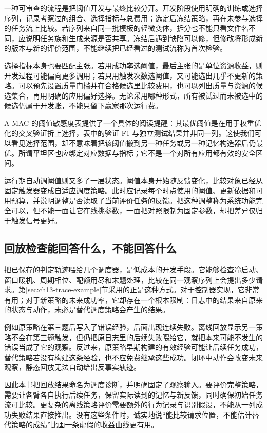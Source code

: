 一种可审查的流程是把阈值开发与最终比较分开。开发阶段使用明确的训练或选择序列，记录考察过的组合、选择指标与总费用；选定后冻结策略，再在未参与选择的任务流上比较。若序列来自同一批模板的轻微变体，拆分也不能只看文件名不同，应说明任务族和生成来源是否共享。冻结后遇到缺陷可以修，但修改将形成新的版本与新的评价范围，不能继续把已经看过的测试流称为首次检验。

选择指标本身也要匹配主张。若用成功率选阈值，最后主张的是单位资源收益，则开发过程可能偏向更多调用；若只用触发次数选阈值，又可能选出几乎不更新的策略。可以预先设置质量门槛并在合格候选里比较费用，也可以列出质量与资源的候选集合，再用明确的应用偏好选择。无论采用哪种形式，所有被试过而未被选中的候选仍属于开发账，不能只留下赢家那次运行费。

A-MAC 的阈值敏感度表提供了一个具体的阅读提醒：其最优阈值是在用于权重优化的交叉验证折上选择，表中的验证 F1 与独立测试结果并非同一列\cite{amac-2603}。这使我们可以看见选择范围，却不意味着把该阈值搬到另一种任务或另一种记忆构造器后仍最优。所谓平坦区也应绑定对应数据与指标；它不是一个对所有应用都有效的安全区间。

运行期自动调阈值则又多了一层状态。阈值本身开始随反馈变化，比较对象已经从固定触发器变成自适应调度策略。此时应记录每个时点使用的阈值、更新依据和可用预算，并说明调整是否读取了当前评价任务的反馈。把这种调整称为系统功能完全可以，但不能一面让它在线挑参数，一面把对照限制为固定参数，却把差异仅归于触发信号更好。

\subsection{回放检查能回答什么，不能回答什么}

把已保存的判定轨迹喂给几个调度器，是低成本的开发手段。它能够检查冷启动、窗口暖机、周期相位、配额用尽和末题处理，比较在同一观察序列上会提出多少请求。第\ref{sec:ch13-trace-example}节采用的正是这种方式。对于控制器实现，它非常有用；对于新策略的未来成功率，它却存在一个根本限制：日志中的结果来自原来的状态与动作，未必是替代调度策略会产生的结果。

例如原策略在第三题后写入了错误经验，后面出现连续失败。离线回放显示另一策略不会在第三题触发，但仍把原日志里的后续失败喂给它，就把本来可能不发生的错误当成了它的观察。反过来，原策略早期构建的有效经验可能让后续任务成功，替代策略若没有构建这条经验，也不应免费继承这些成功。闭环中动作会改变未来观察，静态回放无法自动给出反事实轨迹。

因此本书把回放结果命名为调度诊断，并明确固定了观察输入。要评价完整策略，需要让各臂各自执行后续任务，保留实际读到的记忆与新反馈，同时确保初始任务流可比较。更复杂的离线策略评价需要额外的行为记录与识别假设，不能从一列成功失败结果直接推出。没有这些条件时，诚实地说“能比较请求位置，不能估计替代策略的成绩”比画一条虚假的收益曲线更有用。

